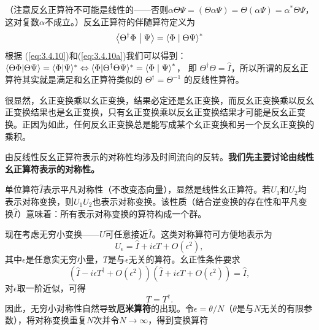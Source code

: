 （注意反幺正算符不可能是线性的——否则$\alpha \Theta\Psi=(\Theta\alpha\Psi)=\Theta(\alpha\Psi)=\alpha^*\Theta\Psi$，这对复数$\alpha$不成立。）反幺正算符的伴随算符定义为
\begin{equation}
	\left\langle {{{\Theta^\dag }\Phi }}
	\mathrel{\left | {\vphantom {{{U^\dag }\Phi } \Psi }}
		\right. \kern-\nulldelimiterspace}
	{\Psi } \right\rangle  = {\left\langle {\Phi }
		\mathrel{\left | {\vphantom {\Phi  {\Theta\Psi }}}
			\right. \kern-\nulldelimiterspace}
		{{\Theta\Psi }} \right\rangle ^*} \label{eq:3.4.10a}
\end{equation}
根据 (\ref{eq:3.4.10})和(\ref{eq:3.4.10a})我们可以得到：
$\langle \Theta\Phi |\Theta\Psi \rangle  = {\langle \Phi |\Psi \rangle ^*}
\Leftrightarrow {\langle \Phi |{\Theta^\dag }\Theta\Psi \rangle ^*} = {\left\langle {\Phi }
	\mathrel{\left | {\vphantom {\Phi  \Psi }}
		\right. \kern-\nulldelimiterspace}
	{\Psi } \right\rangle ^*}$，
即 ${\Theta^\dag }\Theta = \hat I$，所以所谓的反幺正算符其实就是满足和幺正算符类似的 
$\Theta^{\dagger} = \Theta^{-1}$ 的反线性算符。\par
很显然，幺正变换乘以幺正变换，结果必定还是幺正变换，而反幺正变换乘以反幺正变换结果也是幺正变换，只有幺正变换乘以反幺正变换结果才可能是反幺正变换。正因为如此，任何反幺正变换总是能写成某个幺正变换和另一个反幺正变换的乘积。
\par
由反线性反幺正算符表示的对称性均涉及时间流向的反转。\textbf{我们先主要讨论由线性幺正算符表示的对称性。}\par
单位算符$\hat I$表示平凡对称性（不改变态向量），显然是线性幺正算符。若$U_1$和$U_2$均表示对称变换，则$U_1U_2$也表示对称变换。该性质（结合逆变换的存在性和平凡变换$\hat I$）意味着：所有表示对称变换的算符构成一个群。\par
现在考虑无穷小变换——$U$可任意接近$\hat I$。这类对称算符可方便地表示为
\begin{equation}
	U_\epsilon=\hat I+i\epsilon T+O(\epsilon^2), \label{eq:3.4.11} 
\end{equation}
其中$\epsilon$是任意实无穷小量，$T$是与$\epsilon$无关的算符。幺正性条件要求
\begin{equation}
	(\hat I-i\epsilon T^\dagger+O(\epsilon^2))(\hat I+i\epsilon T+O(\epsilon^2))=\hat I,
\end{equation}
对$\epsilon$取一阶近似，可得
\begin{equation}
	T=T^\dagger.
\end{equation}
因此，无穷小对称性自然导致\textbf{厄米算符}的出现。令$\epsilon=\theta/N$（$\theta$是与$N$无关的有限参数），将对称变换重复$N$次并令$N\to\infty$，得到变换算符
